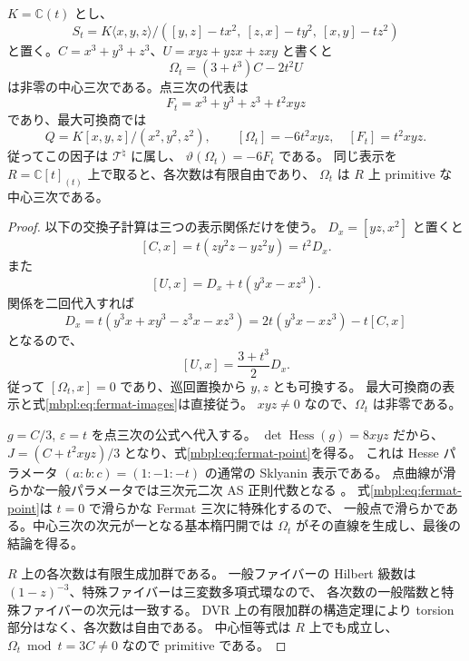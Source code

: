 \begin{lemma}
\label{mbpl:lem:fermat}
$K=\mathbb C(t)$ とし、
\[
 S_t=K\langle x,y,z\rangle/
 ([y,z]-t x^2,\ [z,x]-t y^2,\ [x,y]-t z^2)
\]
と置く。$C=x^3+y^3+z^3$、$U=xyz+yzx+zxy$ と書くと
\begin{equation}\label{mbpl:eq:fermat-center}
 \Omega_t=(3+t^3)C-2t^2U
\end{equation}
は非零の中心三次である。点三次の代表は
\begin{equation}\label{mbpl:eq:fermat-point}
 F_t=x^3+y^3+z^3+t^2xyz
\end{equation}
であり、最大可換商では
\begin{equation}\label{mbpl:eq:fermat-images}
 Q=K[x,y,z]/(x^2,y^2,z^2),\qquad
 [\Omega_t]=-6t^2xyz,\quad [F_t]=t^2xyz.
\end{equation}
従ってこの因子は $\mathcal T^\natural$ に属し、
$\vartheta(\Omega_t)=-6F_t$ である。
同じ表示を $R=\mathbb C[t]_{(t)}$ 上で取ると、各次数は有限自由であり、
$\Omega_t$ は $R$ 上 primitive な中心三次である。
\end{lemma}

\begin{proof}
以下の交換子計算は三つの表示関係だけを使う。
$D_x=[yz,x^2]$ と置くと
\[
 [C,x]=t(zy^2z-yz^2y)=t^2D_x.
\]
また
\[
 [U,x]=D_x+t(y^3x-xz^3).
\]
関係を二回代入すれば
\[
 D_x=t(y^3x+xy^3-z^3x-xz^3)
     =2t(y^3x-xz^3)-t[C,x]
\]
となるので、
\[
 [U,x]=\frac{3+t^3}{2}D_x.
\]
従って $[\Omega_t,x]=0$ であり、巡回置換から $y,z$ とも可換する。
最大可換商の表示と式\eqref{mbpl:eq:fermat-images}は直接従う。
$xyz\ne0$ なので、$\Omega_t$ は非零である。

$g=C/3$, $\varepsilon=t$ を点三次の公式へ代入する。
$\det\operatorname{Hess}(g)=8xyz$ だから、
$J=(C+t^2xyz)/3$ となり、式\eqref{mbpl:eq:fermat-point}を得る。
これは Hesse パラメータ $(a:b:c)=(1:-1:-t)$ の通常の Sklyanin 表示である。
点曲線が滑らかな一般パラメータでは三次元二次 AS 正則代数となる
\cite[Section~1, Theorems~6.6, 6.8]{GRSklyaninATV}。
式\eqref{mbpl:eq:fermat-point}は $t=0$ で滑らかな Fermat 三次に特殊化するので、
一般点で滑らかである。中心三次の次元が一となる基本楕円開では
$\Omega_t$ がその直線を生成し、最後の結論を得る。

$R$ 上の各次数は有限生成加群である。
一般ファイバーの Hilbert 級数は $(1-z)^{-3}$、特殊ファイバーは三変数多項式環なので、
各次数の一般階数と特殊ファイバーの次元は一致する。
DVR 上の有限加群の構造定理により torsion 部分はなく、各次数は自由である。
中心恒等式は $R$ 上でも成立し、$\Omega_t\bmod t=3C\ne0$ なので primitive である。
\end{proof}

